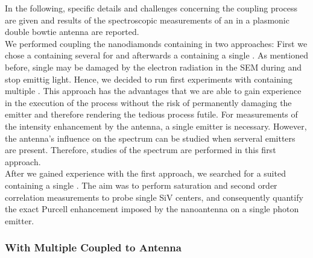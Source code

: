 		In the following, specific details and challenges concerning the coupling process are given and results of the spectroscopic measurements of an \siv in a plasmonic double bowtie antenna are reported.
		\\
		We performed coupling the nanodiamonds containing \sivs in two approaches:
		First we chose a \nd containing several \sivs for \pp and afterwards a \nd containing a single \siv.
		As mentioned before, single \sivs may be damaged by the electron radiation in the SEM during \pp and stop emittig \pl light.
		Hence, we decided to run first experiments with \nds containing multiple \sivs. 
		This approach has the advantages that we are able to gain experience in the execution of the \pp process without the risk of permanently damaging the emitter and therefore rendering the tedious \pp process futile. 
		For measurements of the intensity enhancement by the antenna, a single emitter is necessary.
		However, the antenna's influence on the \siv spectrum can be studied when serveral emitters are present.
		Therefore, studies of the spectrum are performed in this first approach.
		\\
		After we gained experience with the first approach, we  searched for a suited \nd containing a single \siv.
		The aim was to perform saturation and second order correlation measurements to probe single SiV centers, and consequently quantify the exact Purcell enhancement imposed by the nanoantenna on a single photon emitter.



		\subsubsection{\Nd With Multiple \sivs Coupled to Antenna}

